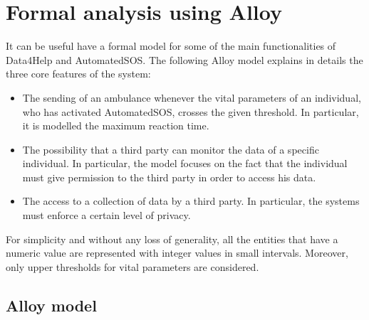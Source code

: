 \chapter{Formal analysis using Alloy}
It can be useful have a formal model for some of the main functionalities of Data4Help and AutomatedSOS. The following Alloy model explains in details the three core features of the system:

\begin{itemize}
\item The sending of an ambulance whenever the vital parameters of an individual, who has activated AutomatedSOS, crosses the given threshold. In particular, it is modelled the maximum reaction time.
\item The possibility that a third party can monitor the data of a specific individual. In particular, the model focuses on the fact that the individual must give permission to the third party in order to access his data.
\item The access to a collection of data by a third party. In particular, the systems must enforce a certain level of privacy.
\end{itemize}
For simplicity and without any loss of generality, all the entities that have a numeric value are represented with integer values in small intervals. Moreover, only upper thresholds for vital parameters are considered.

\section{Alloy model}


